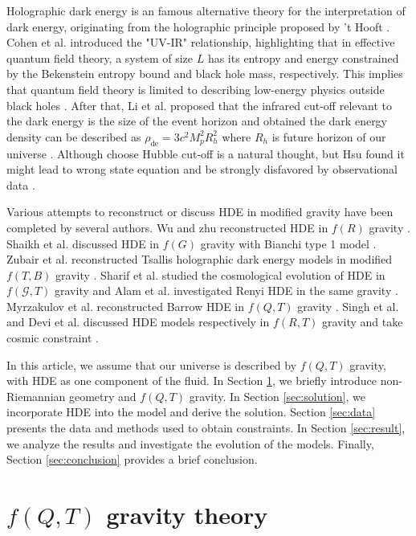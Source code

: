 \documentclass[a4paper,fleqn]{cas-sc}
\begin{document}
Holographic dark energy is an famous alternative theory for the interpretation of dark energy, originating from the holographic principle proposed by 't Hooft \cite{hooft2009dimensionalreductionquantumgravity}. Cohen et al. introduced the "UV-IR" relationship, highlighting that in effective quantum field theory, a system of size $L$ has its entropy and energy constrained by the Bekenstein entropy bound and black hole mass, respectively. This implies that quantum field theory is limited to describing low-energy physics outside black holes \cite{cohen_effective_1999}. After that, Li et al. proposed that the infrared cut-off relevant to the dark energy is the size of the event horizon and obtained the dark energy density can be described as $\rho_\text{de}=3c^2 M_p^2 R_h^2$ where $R_h$ is future horizon of our universe \cite{LI20041}. Although choose Hubble cut-off is a natural thought, but Hsu found it might lead to wrong state equation and be strongly disfavored by observational data \cite{Hsu_2004}.

Various attempts to reconstruct or discuss HDE in modified gravity have been completed by several authors. Wu and zhu reconstructed HDE in $f(R) $ gravity \cite{wu_reconstructing_2008}. Shaikh et al. discussed HDE in $f (G)$ gravity with Bianchi type 1 model \cite{shaikh_holographic_2020}. Zubair et al. reconstructed Tsallis holographic dark energy models in modified $f(T, B)$ gravity \cite{zubair_reconciling_2021}. Sharif et al. studied the cosmological evolution of HDE in $f(\mathcal{G},T)$ gravity \cite{sharif_cosmic_2019} and Alam et al. investigated Renyi HDE in the same gravity \cite{alam_renyi_2023}. Myrzakulov et al. reconstructed Barrow HDE in $f(Q,T)$ gravity \cite{myrzakulov_barrow_2024}. Singh et al. and Devi et al. discussed HDE models respectively in $f(R,T)$ gravity and take cosmic constraint \cite{singh_statefinder_2016,devi_barrow_2024}.

In this article, we assume that our universe is described by $ f(Q,T) $ gravity, with HDE as one component of the fluid. In Section \ref{sec:mg}, we briefly introduce non-Riemannian geometry and $f(Q,T)$ gravity. In Section \ref{sec:solution}, we incorporate HDE into the model and derive the solution. Section \ref{sec:data} presents the data and methods used to obtain constraints. In Section \ref{sec:result}, we analyze the results and investigate the evolution of the models. Finally, Section \ref{sec:conclusion} provides a brief conclusion.

\section{$f(Q,T)$ gravity theory}\label{sec:mg}
\end{document}
